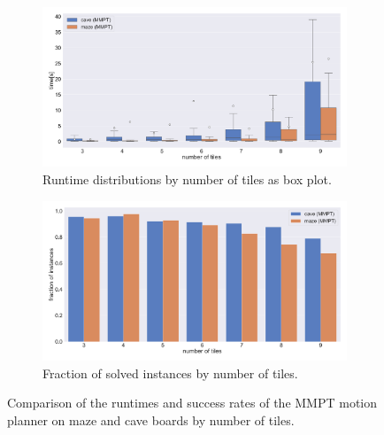 \begin{figure}[htpb]
\begin{subfigure}[b]{\textwidth}
\centering
\includegraphics[width=\textwidth]{figures/plots/heuristic_solvers_i1/mmpt_i1_maze_vs_cave_time.pdf}
\caption{Runtime distributions by number of tiles as box plot.}
\label{fig:i1_mmpt_maze_cave_time}
\end{subfigure}
\begin{subfigure}[b]{\textwidth}
\centering
\includegraphics[width=\textwidth]{figures/plots/heuristic_solvers_i1/mmpt_i1_maze_vs_cave_fraction_solved.pdf}
\caption{Fraction of solved instances by number of tiles.}
\label{fig:i1_mmpt_maze_cave_fraction_solved}
\end{subfigure}
\caption[Runtime and success rate of MMPT on maze and cave boards]{Comparison of the runtimes and success rates of the MMPT motion planner on maze and cave boards by number of tiles.}
\label{fig:i1_mmpt_maze_cave}
\end{figure}

